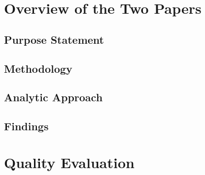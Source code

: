 \documentclass[
    a4paper,            %
    12pt,               %
    stu,                %
    noextraspace,       %
    floatsintext,       %
    biblatex,           %
    colorlinks=true,        %
    linkcolor=red,          %
    anchorcolor=black,      %
    citecolor=blue,         %
    urlcolor=blue,          %
    bookmarks=true,         %
    bookmarksopen=false,    %
    bookmarksnumbered=true  %
]{apa7}
\begin{document}
\section{Overview of the Two Papers}

\subsection{Purpose Statement}

\subsection{Methodology}

\subsection{Analytic Approach}

\subsection{Findings}

\section{Quality Evaluation}

\printbibliography
\end{document}
